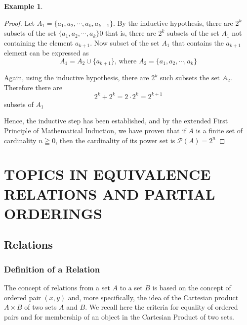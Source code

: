 \documentclass{book}
\theoremstyle{definition}
\newtheorem{example}{Example}[definition]
\theoremstyle{remark}
\newcommand{\m}{\cdot}
\begin{document}
\begin{example}
\begin{proof}
        Let $A_1 = \{a_1, a_2, \cdots , a_k, a_{k+1} \}$. By the inductive hypothesis, there are $2^k$ subsets of the set $\{a_1, a_2, \cdots , a_k \}0$ that is, there are $2^k$ subsets of the set $A_1$ not containing the element $a_{k+1}$. Now subset of the set $A_1$ that contains the $a_{k+1}$ element can be expressed as 
            \begin{equation*}
                A_1 = A_2 \cup \{a_{k+1} \} \text{, where } A_2 = \{a_1, a_2, \cdots , a_k  \}
            \end{equation*}
        
        Again, using the inductive hypothesis, there are $2^k$ such subsets the set $A_2$. Therefore there are 
            \begin{equation*}
                2^k + 2^k = 2 \m 2^k = 2^{k+1}
            \end{equation*}
        subsets of $A_1$
        
        Hence, the inductive step has been established, and by the extended First Principle of Mathematical Induction, we have proven that if $A$ is a finite set of cardinality $n \geqq 0$, then the cardinality of its power set is $\mathcal P \left({A}\right) =2^n$

    \end{proof}
\end{example}







\newpage
\chapter{TOPICS IN EQUIVALENCE RELATIONS AND PARTIAL ORDERINGS}

\section{Relations}

\subsection{Definition of a Relation}

    The concept of relations from a set $A$ to a set $B$ is based on the concept of ordered pair $(x,y)$ and, more specifically, the idea of the Cartesian product $A \times B$ of two sets $A$ and $B$. We recall here the criteria for equality of ordered pairs and for membership of an object in the Cartesian Product of two sets. 
    
\end{document}
